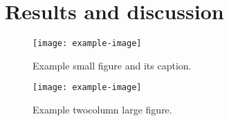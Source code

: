 

\section{Results and discussion}

\begin{figure}[htb]
    \centering
    \texttt{[image: example-image]}
    \caption{%
        Example small figure and its caption.
    }\label{fig:caption-1}
\end{figure}

\lipsum[1-6]{}

\begin{figure*}[htb]
    \centering
    \texttt{[image: example-image]}
    \caption{%
        Example twocolumn large figure.
    }\label{fig:caption-2}
\end{figure*}

\lipsum[2-4]{}